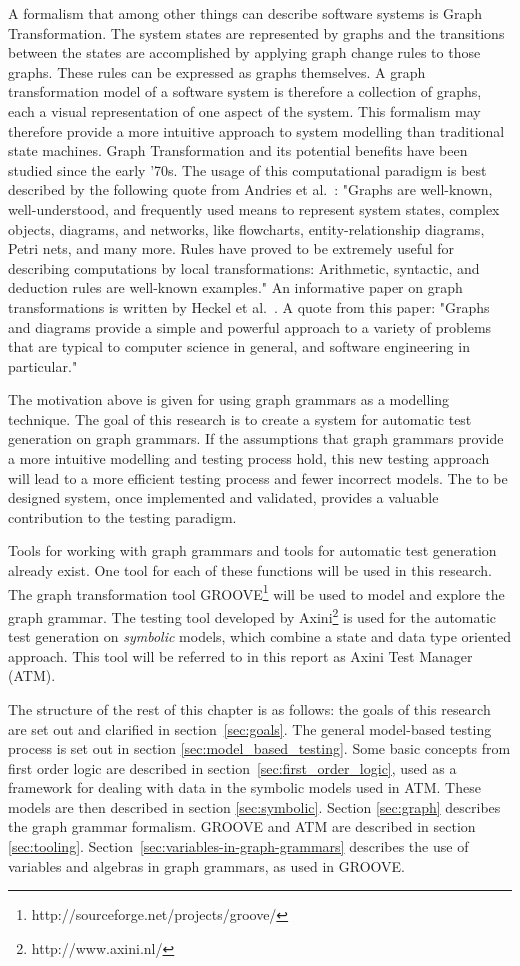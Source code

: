 A formalism that among other things can describe software systems is Graph Transformation. The system states are represented by graphs and the transitions between the states are accomplished by applying graph change rules to those graphs. These rules can be expressed as graphs themselves. A graph transformation model of a software system is therefore a collection of graphs, each a visual representation of one aspect of the system. This formalism may therefore provide a more intuitive approach to system modelling than traditional state machines. Graph Transformation and its potential benefits have been studied since the early '70s. The usage of this computational paradigm is best described by the following quote from Andries et al.~\cite{Andries1999}: "Graphs are well-known, well-understood, and frequently used means to represent system states, complex objects, diagrams, and networks, like flowcharts, entity-relationship diagrams, Petri nets, and many more. Rules have proved to be extremely useful for describing computations by local transformations: Arithmetic, syntactic, and deduction rules are well-known examples." An informative paper on graph transformations is written by Heckel et al.~\cite{Heckel2006187}. A quote from this paper: "Graphs and diagrams provide a simple and powerful approach to a variety of problems that are typical to computer science in general, and software engineering in particular."

The motivation above is given for using graph grammars as a modelling technique. The goal of this research is to create a system for automatic test generation on graph grammars. If the assumptions that graph grammars provide a more intuitive modelling and testing process hold, this new testing approach will lead to a more efficient testing process and fewer incorrect models. The to be designed system, once implemented and validated, provides a valuable contribution to the testing paradigm.

Tools for working with graph grammars and tools for automatic test generation already exist. One tool for each of these functions will be used in this research. The graph transformation tool GROOVE\footnote{http://sourceforge.net/projects/groove/} will be used to model and explore the graph grammar. The testing tool developed by Axini\footnote{http://www.axini.nl/} is used for the automatic test generation on \textit{symbolic} models, which combine a state and data type oriented approach. This tool will be referred to in this report as Axini Test Manager (ATM).

The structure of the rest of this chapter is as follows: the goals of this research are set out and clarified in section~\ref{sec:goals}. The general model-based testing process is set out in section \ref{sec:model_based_testing}. Some basic concepts from first order logic are described in section~\ref{sec:first_order_logic}, used as a framework for dealing with data in the symbolic models used in ATM. These models are then described in section \ref{sec:symbolic}. Section \ref{sec:graph} describes the graph grammar formalism. GROOVE and ATM are described in section \ref{sec:tooling}. Section~\ref{sec:variables-in-graph-grammars} describes the use of variables and algebras in graph grammars, as used in GROOVE.
